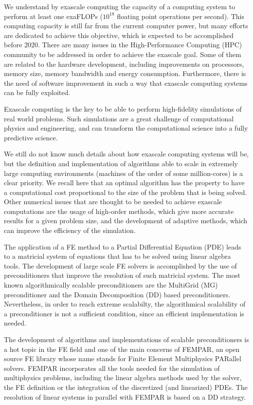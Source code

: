 We understand by exascale computing the capacity of a computing system to perform at least one exaFLOPs ($ 10^{18} $ floating point operations per second). This computing capacity is still far from the current computer power, but many efforts are dedicated to achieve this objective, which is expected to be accomplished before 2020. There are many issues in the High-Performance Computing (HPC) community to be addressed in order to achieve the exascale goal. Some of them are related to the hardware development, including improvements on processors, memory size, memory bandwidth and energy consumption. Furthermore, there is the need of software improvement in such a way that exascale computing systems can be fully exploited.

Exascale computing is the key to be able to perform high-fidelity simulations of real world problems. Such simulations are a great challenge of computational physics and engineering, and can transform the computational science into a fully predictive science.

We still do not know much details about how exascale computing systems will be, but the definition and implementation of algorithms able to scale in extremely large computing environments (machines of the order of some million-cores) is a clear priority. We recall here that an optimal algorithm has the property to have a computational cost proportional to the size of the problem that is being solved. Other numerical issues that are thought to be needed to achieve exascale computations are the usage of high-order methods, which give more accurate results for a given problem size, and the development of adaptive methods, which can improve the efficiency of the simulation.

The application of a FE method to a Partial Differential Equation (PDE) leads to a matricial system of equations that has to be solved using linear algebra tools. The development of large scale FE solvers is accomplished by the use of preconditioners that improve the resolution of such matricial system. The most known algorithmically scalable preconditioners are the MultiGrid (MG) preconditioner and the Domain Decomposition (DD) based preconditioners. Nevertheless, in order to reach extreme scalabilty, the algorithmical scalability of a preconditioner is not a sufficient condition, since an efficient implementation is needed. 

The development of algorithms and implementations of scalable preconditioners is a hot topic in the FE field and one of the main concerns of FEMPAR, an open source FE library whose name stands for Finite Element Multiphysics PARallel solvers. FEMPAR incorporates all the tools needed for the simulation of multiphysics problems, including the linear algebra methods used by the solver, the FE definition or the integration of the discretized (and linearized) PDEs. The resolution of linear systems in parallel with FEMPAR is based on a DD strategy.

